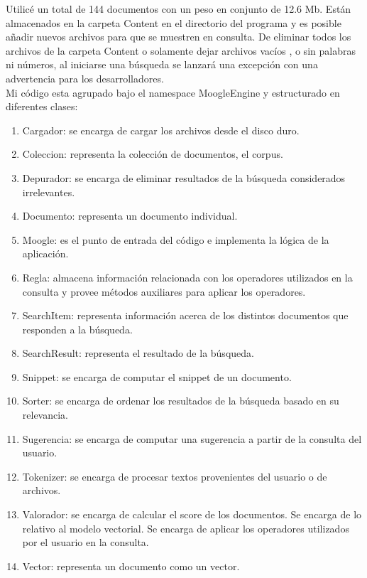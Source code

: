 \documentclass{article}
\begin{document}
Utilicé un total de 144 documentos con un peso en conjunto de 12.6 Mb. Están almacenados en la carpeta Content en el directorio del programa y es posible añadir nuevos archivos para que se muestren en consulta. De eliminar todos los archivos de la carpeta Content o solamente dejar archivos vacíos , o sin palabras ni números, al iniciarse una búsqueda se lanzará una excepción con una advertencia para los desarrolladores.
\\
Mi código esta agrupado bajo el namespace MoogleEngine y estructurado en diferentes clases:
\begin{enumerate}
  \item Cargador: se encarga de cargar los archivos desde el disco duro.
	\item Coleccion: representa la colección de documentos, el corpus.
	\item Depurador: se encarga de eliminar resultados de la búsqueda considerados irrelevantes.
	\item Documento: representa un documento individual.
	\item Moogle: es el punto de entrada del código e implementa la lógica de la aplicación.
	\item Regla: almacena información relacionada con los operadores utilizados en la consulta y 	provee métodos auxiliares para aplicar los operadores.
	\item SearchItem: representa información acerca de los distintos documentos que responden a la 	búsqueda.
	\item SearchResult: representa el resultado de la búsqueda.
	\item Snippet: se encarga de computar el snippet de un documento.
	\item Sorter: se encarga de ordenar los resultados de la búsqueda basado en su relevancia.
	\item Sugerencia: se encarga de computar una sugerencia a partir de la consulta del usuario.
	\item Tokenizer: se encarga de procesar textos provenientes del usuario o de archivos.
	\item Valorador: se encarga de calcular el score de los documentos. Se encarga de lo relativo al 	modelo vectorial. Se encarga de aplicar los operadores utilizados por el usuario en la 	consulta.
	\item Vector: representa un documento como un vector.
\end{enumerate}
\end{document}
